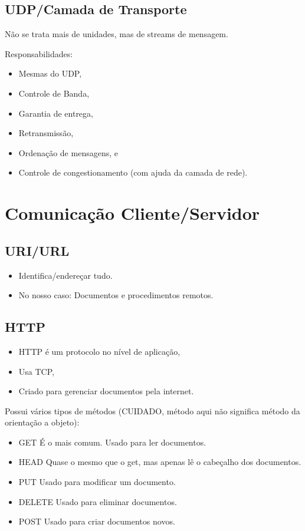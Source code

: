 \documentclass{book}
\begin{document}
\section{UDP/Camada de Transporte}

Não se trata mais de unidades, mas de streams de mensagem.

Responsabilidades:
\begin{itemize}
\item Mesmas do UDP,
\item Controle de Banda,
\item Garantia de entrega,
\item Retransmissão,
\item Ordenação de mensagens, e
\item Controle de congestionamento (com ajuda da camada de rede).
\end{itemize}

\chapter{Comunicação Cliente/Servidor}

\section{URI/URL}
\begin{itemize}
\item Identifica/endereçar tudo.
\item No nosso caso: Documentos e procedimentos remotos.
\end{itemize}

\section{HTTP}

\begin{itemize}
\item HTTP é um protocolo no nível de aplicação,
\item Usa TCP,
\item Criado para gerenciar documentos pela internet.
\end{itemize}

Possui vários tipos de métodos (CUIDADO, método aqui não significa método da orientação a objeto):

\begin{itemize}
\item GET 
É o mais comum. Usado para ler documentos.

\item HEAD
Quase o mesmo que o get, mas apenas lê o cabeçalho dos documentos.

\item PUT
Usado para modificar um documento.

\item DELETE
Usado para eliminar documentos.

\item POST
Usado para criar documentos novos.

\end{itemize}
\end{document}
